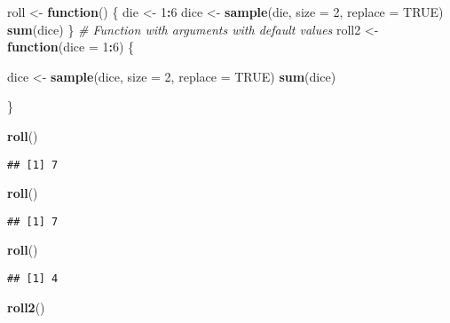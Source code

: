 \documentclass[
]{article}
\newenvironment{Shaded}{\begin{snugshade}}{\end{snugshade}}
\newcommand{\AttributeTok}[1]{\textcolor[rgb]{0.13,0.29,0.53}{#1}}
\newcommand{\CommentTok}[1]{\textcolor[rgb]{0.56,0.35,0.01}{\textit{#1}}}
\newcommand{\ConstantTok}[1]{\textcolor[rgb]{0.56,0.35,0.01}{#1}}
\newcommand{\ControlFlowTok}[1]{\textcolor[rgb]{0.13,0.29,0.53}{\textbf{#1}}}
\newcommand{\DecValTok}[1]{\textcolor[rgb]{0.00,0.00,0.81}{#1}}
\newcommand{\FunctionTok}[1]{\textcolor[rgb]{0.13,0.29,0.53}{\textbf{#1}}}
\newcommand{\NormalTok}[1]{#1}
\newcommand{\OtherTok}[1]{\textcolor[rgb]{0.56,0.35,0.01}{#1}}
\newcommand{\SpecialCharTok}[1]{\textcolor[rgb]{0.81,0.36,0.00}{\textbf{#1}}}
\begin{document}
\begin{Shaded}
\begin{Highlighting}[]
\NormalTok{roll }\OtherTok{\textless{}{-}} \ControlFlowTok{function}\NormalTok{() \{}
\NormalTok{die }\OtherTok{\textless{}{-}} \DecValTok{1}\SpecialCharTok{:}\DecValTok{6}
\NormalTok{dice }\OtherTok{\textless{}{-}} \FunctionTok{sample}\NormalTok{(die, }\AttributeTok{size =} \DecValTok{2}\NormalTok{, }\AttributeTok{replace =} \ConstantTok{TRUE}\NormalTok{)}
\FunctionTok{sum}\NormalTok{(dice)}
\NormalTok{\}}
\CommentTok{\# Function with arguments with default values}
\NormalTok{roll2 }\OtherTok{\textless{}{-}} \ControlFlowTok{function}\NormalTok{(}\AttributeTok{dice =} \DecValTok{1}\SpecialCharTok{:}\DecValTok{6}\NormalTok{) \{}

\NormalTok{dice }\OtherTok{\textless{}{-}} \FunctionTok{sample}\NormalTok{(dice, }\AttributeTok{size =} \DecValTok{2}\NormalTok{, }\AttributeTok{replace =} \ConstantTok{TRUE}\NormalTok{)}
\FunctionTok{sum}\NormalTok{(dice)}

\NormalTok{\}}

\FunctionTok{roll}\NormalTok{()}
\end{Highlighting}
\end{Shaded}

\begin{verbatim}
## [1] 7
\end{verbatim}

\begin{Shaded}
\begin{Highlighting}[]
\FunctionTok{roll}\NormalTok{()}
\end{Highlighting}
\end{Shaded}

\begin{verbatim}
## [1] 7
\end{verbatim}

\begin{Shaded}
\begin{Highlighting}[]
\FunctionTok{roll}\NormalTok{()}
\end{Highlighting}
\end{Shaded}

\begin{verbatim}
## [1] 4
\end{verbatim}

\begin{Shaded}
\begin{Highlighting}[]
\FunctionTok{roll2}\NormalTok{()}
\end{Highlighting}
\end{Shaded}
\end{document}

